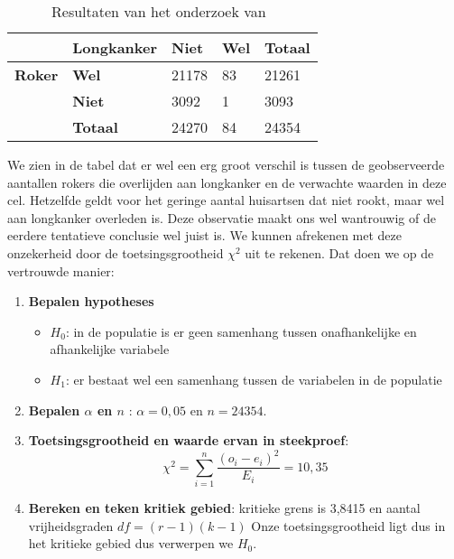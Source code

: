 \begin{table}
  \begin{center}
    \begin{tabular}{@{}lllll@{}}
      \toprule
                       & \textbf{Longkanker} & \textbf{Niet} & \textbf{Wel} & \textbf{Totaal} \\
        \midrule
        \textbf{Roker} & \textbf{Wel}        & 21178         & 83           & 21261           \\
                       & \textbf{Niet}       & 3092          & 1            & 3093            \\
                       & \textbf{Totaal}     & 24270         & 84           & 24354           \\
        \bottomrule
    \end{tabular}
  \end{center}
  \caption{Resultaten van het onderzoek van~\textcite{Doll1954}}
  \label{tab:dollhill}
\end{table}

We zien in de tabel dat er wel een erg groot verschil is tussen de geobserveerde aantallen rokers die overlijden aan longkanker en de verwachte waarden in deze cel. Hetzelfde geldt voor het geringe aantal huisartsen dat niet rookt, maar wel aan longkanker overleden is. Deze observatie maakt ons wel wantrouwig of de eerdere tentatieve conclusie wel juist is. We kunnen afrekenen met deze onzekerheid door de toetsingsgrootheid $\chi^{2}$ uit te rekenen. Dat doen we op de vertrouwde manier:


\begin{enumerate}
	\item \textbf{Bepalen hypotheses}	
		\begin{itemize}
			\item $H_{0}$: in de populatie is er geen samenhang tussen onafhankelijke en afhankelijke variabele
			\item $H_{1}$: er bestaat wel een samenhang tussen de variabelen in de populatie
		\end{itemize}
	\item \textbf{Bepalen $\alpha$ en $n$} : $\alpha = 0,05$ en $n = 24354$.
	\item \textbf{Toetsingsgrootheid en waarde ervan in steekproef}:
	\[ \chi^{2} = \sum_{i=1}^{n} \frac{(o_{i} - e_{i})^{2}}{E_{i}} = 10,35 \]
	\item \textbf{Bereken en teken kritiek gebied}:  kritieke grens is 3,8415 en aantal vrijheidsgraden $df = (r-1)(k-1)$ Onze toetsingsgrootheid ligt dus in het kritieke gebied dus verwerpen we $H_{0}$. 
\end{enumerate}

